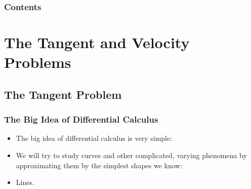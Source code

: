 \documentclass[serif,ignorenonframetext]{beamer}
\title{\commonTitleZeroOneFour}
\subtitle{\commonSubtitleZeroOneFour}
\author{\commonAuthor}
\institute{\commonInstitute}
\date{\commonDateZeroOneFour}
\begin{document}

\begin{frame}
  \titlepage
\end{frame}

\begin{frame}
  \frametitle{Contents}
  \tableofcontents
\end{frame}

\section{The Tangent and Velocity Problems}

\subsection{The Tangent Problem}

\begin{frame}
  \frametitle{The Big Idea of Differential Calculus}
  \begin{itemize}[<+->]
  \item The big idea of differential calculus is very simple:
  \item We will try to study curves and other complicated, varying
    phenomena by approximating them by the simplest shapes we know:
  \item Lines.
  \end{itemize}
\end{frame}
\end{document}

